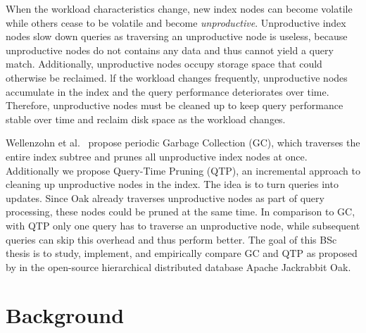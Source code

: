 \documentclass[abstracton,12pt]{scrartcl}
\theoremstyle{definition}
\begin{document}
When the workload characteristics change, new index nodes can become volatile
while others cease to be volatile and become \textit{unproductive}. Unproductive
index nodes slow down queries as traversing an unproductive node is useless,
because unproductive nodes do not contains any data 
and thus cannot yield a query match. Additionally, unproductive nodes
occupy storage space that could otherwise be reclaimed. lf the workload changes
frequently, unproductive nodes accumulate in the index and the query
performance deteriorates over time. Therefore, unproductive nodes must be
cleaned up to keep query performance stable over time and reclaim disk space as
the workload changes.

Wellenzohn et al.~\cite{KW17} propose periodic Garbage Collection (GC), which
traverses the entire index subtree and prunes all unproductive index nodes at
once. Additionally we propose Query-Time Pruning (QTP), an incremental approach
to cleaning up unproductive nodes in the index. The idea is to turn queries into
updates. Since Oak already traverses unproductive nodes as part of query
processing, these nodes could be pruned at the same time. In comparison to GC,
with QTP only one query has to traverse an unproductive node, while subsequent
queries can skip this overhead and thus perform better.
The goal of this BSc thesis is to study, implement, and empirically compare GC
and QTP as proposed by \cite{KW17} in the open-source hierarchical distributed
database Apache Jackrabbit Oak.

\section{Background}



\end{document}
